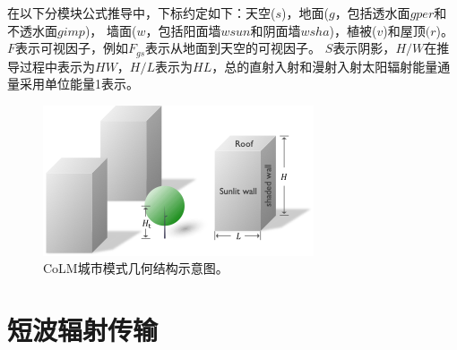 在以下分模块公式推导中，下标约定如下：天空($s$)，地面($g$，包括透水面$gper$和不透水面$gimp$)，
墙面($w$，包括阳面墙$wsun$和阴面墙$wsha$)，植被($v$)和屋顶$(r$)。$F$表示可视因子，例如$F_{gs}$表示从地面到天空的可视因子。
$S$表示阴影，$H/W$在推导过程中表示为$HW$，$H/L$表示为$HL$，总的直射入射和漫射入射太阳辐射能量通量采用单位能量1表示。

{
\begin{figure}[htbp]
\centering
\includegraphics{Figures/城市模式/CoLM城市模式几何结构示意图.png}
\caption{CoLM城市模式几何结构示意图。}
\label{fig:CoLM城市模式几何结构示意图}
\end{figure}
}
\section{短波辐射传输}\label{短波辐射传输}
